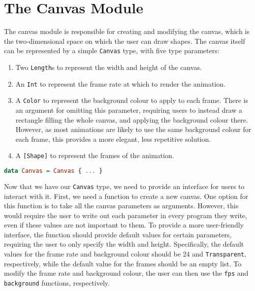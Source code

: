 \documentclass[../main.tex]{subfiles}
\begin{document}
    \section{The Canvas Module}
        The canvas module is responsible for creating and modifying the canvas, which
            is the two-dimensional space on which the user can draw shapes.
        The canvas itself can be represented by a simple \verb|Canvas| type, with five type parameters:
        \begin{enumerate}
            \item Two \verb|Length|s to represent the width and height of the canvas.
            \item An \verb|Int| to represent the frame rate at which to render the animation.
            \item A \verb|Color| to represent the background colour to apply to each frame.
                  There is an argument for omitting this parameter, requiring users to instead
                      draw a rectangle filling the whole canvas, and applying the background colour
                      there.
                  However, as most animations are likely to use the same background colour for
                      each frame, this provides a more elegant, less repetitive solution.
            \item A \verb|[Shape]| to represent the frames of the animation.
        \end{enumerate}

        \begin{lstlisting}[language=Haskell, label={lst:canvas}, morekeywords={Canvas, Length, Color, Shape},
            caption={The Canvas type definition.}]
data Canvas = Canvas { ... }\end{lstlisting}

        Now that we have our \verb|Canvas| type, we need to provide an interface for
            users to interact with it.
        First, we need a function to create a new canvas.
        One option for this function is to take all the canvas parameters as arguments.
        However, this would require the user to write out each parameter in every
            program they write, even if these values are not important to them.
        To provide a more user-friendly interface, the function should provide default
            values for certain parameters, requiring the user to only specify the width and
            height.
        Specifically, the default values for the frame rate and background colour
            should be 24 and \verb|Transparent|, respectively, while the default value for
            the frames should be an empty list.
        To modify the frame rate and background colour, the user can then use the
            \verb|fps| and \verb|background| functions, respectively.
\end{document}
